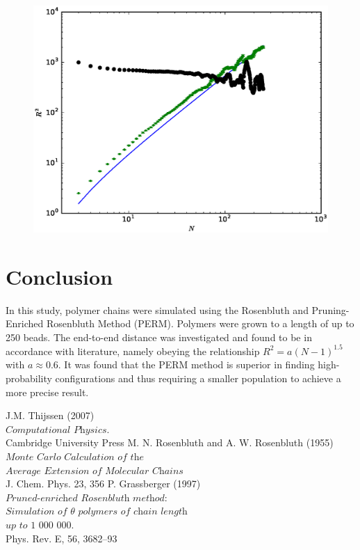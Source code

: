 \documentclass[a4paper,twocolumn]{article}
\begin{document}
\begin{figure}
	\centering
	\includegraphics[width=\linewidth]{r2_perm_1000run.eps}
	\caption{}
	\label{fig:r2_perm}
\end{figure}

\section{Conclusion}

In this study, polymer chains were simulated using the Rosenbluth and Pruning-Enriched Rosenbluth Method (PERM). Polymers were grown to a length of up to 250 beads. The end-to-end distance was investigated and found to be in accordance with literature, namely obeying the relationship $R^2 = a(N-1)^{1.5}$ with $a \approx 0.6$. It was found that the PERM method is superior in finding high-probability configurations and thus requiring a smaller population to achieve a more precise result.

\begin{thebibliography}{9}
	J.M. Thijssen (2007)\\
	$\textit{Computational Physics}$.\\
	Cambridge University Press
	M. N. Rosenbluth and A. W. Rosenbluth (1955)\\
	$\textit{Monte Carlo Calculation of the} $ \\ $\textit{Average Extension of Molecular Chains}$\\
	J. Chem. Phys. 23, 356
	P. Grassberger (1997)\\
	$\textit{Pruned-enriched Rosenbluth method:} $ \\ $\textit{Simulation of $\theta$ polymers of chain length}$ \\ $\textit{up to 1 000 000}$.\\
	Phys. Rev. E, 56, 3682–93
\end{thebibliography}
\end{document}
